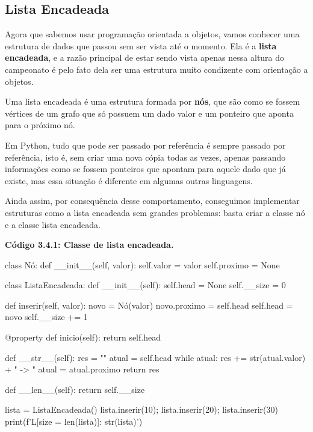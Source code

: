 \documentclass[11pt, a4paper]{article}
\begin{document}
\subsection{Lista Encadeada}

Agora que sabemos usar programação orientada a objetos, vamos conhecer uma estrutura de dados que passou sem ser vista até o momento. Ela é a \textbf{lista encadeada}, e a razão principal de estar sendo vista apenas nessa altura do campeonato é pelo fato dela ser uma estrutura muito condizente com orientação a objetos.

Uma lista encadeada é uma estrutura formada por \textbf{nós}, que são como se fossem vértices de um grafo que só possuem um dado valor e um ponteiro que aponta para o próximo nó.

Em Python, tudo que pode ser passado por referência é sempre passado por referência, isto é, sem criar uma nova cópia todas as vezes, apenas passando informações como se fossem ponteiros que apontam para aquele dado que já existe, mas essa situação é diferente em algumas outras linguagens.

Ainda assim, por consequência desse comportamento, conseguimos implementar estruturas como a lista encadeada sem grandes problemas: basta criar a classe nó e a classe lista encadeada.

\textbf{Código 3.4.1: Classe de lista encadeada.}

\begin{code}
class Nó:
    def __init__(self, valor):
        self.valor = valor
        self.proximo = None

class ListaEncadeada:
    def __init__(self):
        self.head = None
        self.__size = 0

    def inserir(self, valor):
        novo = Nó(valor)
        novo.proximo = self.head
        self.head = novo
        self.__size += 1
    
    @property
    def inicio(self):
        return self.head

    def __str__(self):
        res = ""
        atual = self.head
        while atual:
            res += str(atual.valor) + " -> "
            atual = atual.proximo
        return res
    
    def __len__(self):
        return self.__size
        
lista = ListaEncadeada()
lista.inserir(10); lista.inserir(20); lista.inserir(30)
print(f'L[size = {len(lista)}]: {str(lista)}')
\end{code}
\end{document}
